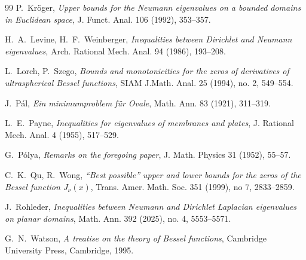 \documentclass[a4paper,12pt]{article}
\numberwithin{equation}{section}
\newcommand{\<}{\langle}
\renewcommand{\>}{\rangle}
\theoremstyle{plain}
\theoremstyle{definition}
\theoremstyle{remark}
\begin{document}
\begin{thebibliography}{99}
 P.~Kr\" oger,
{\it Upper bounds for the Neumann eigenvalues on a bounded domains in Euclidean space}, 
J. Funct. Anal. 106 (1992), 353--357.

 H.~A.~Levine, H.~F.~Weinberger, 
{\it Inequalities between Dirichlet and Neumann eigenvalues}, 
Arch. Rational Mech. Anal. 94 (1986), 193--208.

L.~Lorch, P.~Szego, 
{\it Bounds and monotonicities for the zeros of derivatives of ultraspherical Bessel functions},
SIAM J.Math. Anal. 25 (1994), no. 2, 549--554.

 J.~P\'al, 
{\it Ein minimumproblem f\" ur Ovale}, 
Math. Ann. 83 (1921), 311--319.

 L.~E.~Payne, 
{\it Inequalities for eigenvalues of membranes and plates}, 
J. Rational Mech. Anal. 4 (1955), 517--529.

 G.~P\'olya, 
{\it Remarks on the foregoing paper}, 
J. Math. Physics 31 (1952), 55--57.

C.~K.~Qu, R.~Wong,
{\it “Best possible” upper and lower bounds for the zeros of 
the Bessel function $J_\nu(x)$},
Trans. Amer. Math. Soc. 351 (1999), no 7, 2833--2859.

 J.~Rohleder, 
{\it Inequalities between Neumann and Dirichlet Laplacian eigenvalues on planar domains},
Math. Ann. 392 (2025), no. 4, 5553--5571.

G.~N.~Watson, 
{\it A treatise on the theory of Bessel functions}, 
Cambridge University Press, Cambridge, 1995.




\end{thebibliography}
\end{document}

